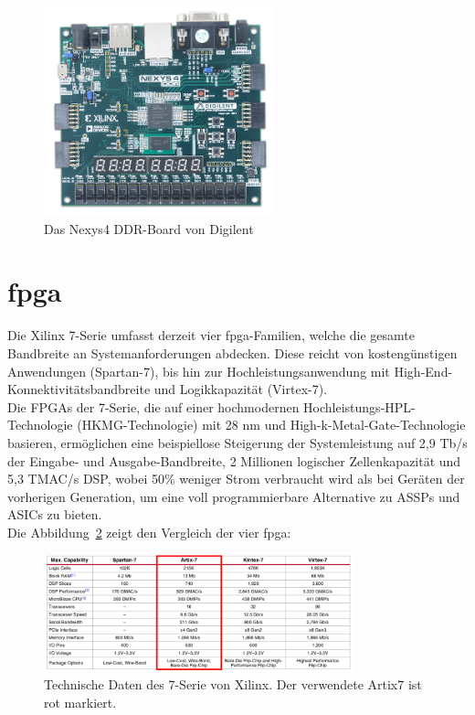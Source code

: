 \begin{figure}[H]
\centering
\includegraphics[width=0.6\textwidth]{Hauptteil/nexys-4-ddr-2.png}
\caption{Das Nexys4 DDR-Board von Digilent~\cite{digilent}}\label{fig:nexys4}
\end{figure}



\section{\acl{fpga}}\label{kap:fpga}
Die Xilinx 7-Serie umfasst derzeit vier \ac{fpga}-Familien, welche die gesamte Bandbreite an Systemanforderungen abdecken. Diese reicht von kostengünstigen Anwendungen (Spartan-7),
 bis hin zur Hochleistungsanwendung mit High-End-Konnektivitätsbandbreite und Logikkapazität (Virtex-7). \\
Die FPGAs der 7-Serie, die auf einer hochmodernen Hochleistungs-HPL-Technologie (HKMG-Technologie) mit 28 nm und High-k-Metal-Gate-Technologie basieren,
 ermöglichen eine beispiellose Steigerung der Systemleistung auf 2,9 Tb/s der Eingabe- und Ausgabe-Bandbreite, 2 Millionen logischer Zellenkapazität und 5,3 TMAC/s DSP,
 wobei 50\% weniger Strom verbraucht wird als bei Geräten der vorherigen Generation, um eine voll programmierbare Alternative zu ASSPs und ASICs zu bieten.\\
 Die Abbildung~\ref{fig:7serie} zeigt den Vergleich der vier \ac{fpga}:~\cite{artix7}\\

 \begin{figure}[H]
 \centering
 \includegraphics[width=0.8\textwidth]{Hauptteil/7serie.png}
 \caption{Technische Daten des 7-Serie von Xilinx. Der verwendete Artix7 ist rot markiert.~\cite{artix7}}\label{fig:7serie}
 \end{figure}


